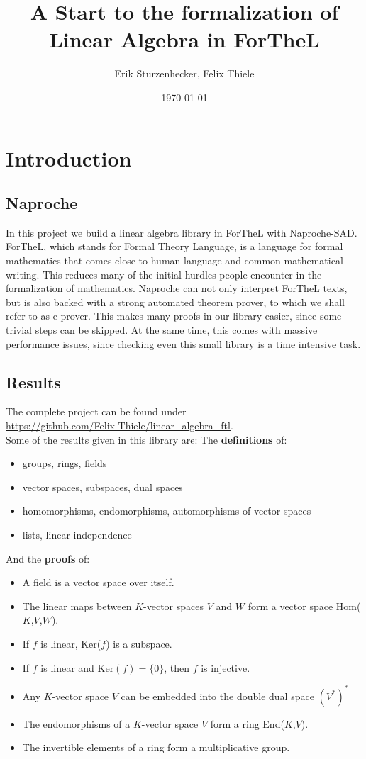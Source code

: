 \documentclass[11pt]{article}
\author{Erik Sturzenhecker, Felix Thiele}
\title{A Start to the formalization of Linear Algebra in ForTheL}
\date{\today}
\begin{document}
\maketitle
\newpage 
\setcounter{tocdepth}{10}
\tableofcontents

\newpage 
\section{Introduction}
\subsection{Naproche}
In this project we build a linear algebra library in ForTheL with Naproche-SAD. ForTheL, which stands for Formal Theory Language, is a language for formal mathematics that comes close to human language and common mathematical writing.
This reduces many of the initial hurdles people encounter in the formalization of mathematics.
Naproche can not only interpret ForTheL texts, but is also backed with a strong automated theorem prover, to which we shall refer to as e-prover.
This makes many proofs in our library easier, since some trivial steps can be skipped.
At the same time, this comes with massive performance issues, since checking even this small library is a time intensive task.

\subsection{Results}
The complete project can be found under\\ \url{https://github.com/Felix-Thiele/linear_algebra_ftl}.\\
Some of the results given in this library are:
\newline
The \textbf{definitions} of:
\begin{itemize}[nolistsep, noitemsep]
\item groups, rings, fields
\item vector spaces, subspaces, dual spaces
\item homomorphisms, endomorphisms, automorphisms of vector spaces
\item lists, linear independence
\end{itemize}
And the \textbf{proofs} of:
\begin{itemize}[nolistsep, noitemsep]
\item A field is a vector space over itself.
\item The linear maps between $K$-vector spaces $V$ and $W$ form a vector space Hom($K$,$V$,$W$).
\item If $f$ is linear, Ker($f$) is a subspace.
\item If $f$ is linear and Ker$(f)=\{0\}$, then $f$ is injective.
\item Any $K$-vector space $V$ can be embedded into the double dual space $(V^{*})^{*}$
\item The endomorphisms of a $K$-vector space $V$ form a ring End($K$,$V$).
\item The invertible elements of a ring form a multiplicative group.
\end{itemize}
\end{document}
